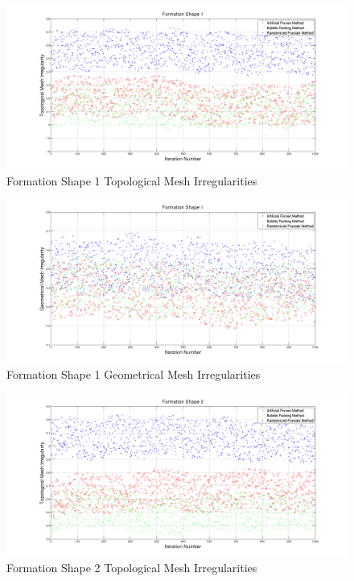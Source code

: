 \begin{figure}[H]
\caption{Formation Shape 1 Topological Mesh Irregularities} \label{topologic_ref_1}
\centerline{\includegraphics[scale = 0.32]{Topological_Irr_1}}
\end{figure} 	
		
\begin{figure}[H]
\caption{Formation Shape 1 Geometrical Mesh Irregularities} \label{geometric_ref_1}
\centerline{\includegraphics[scale = 0.32]{Geometrical_Irr_1}}
\end{figure} 	

\begin{figure}[H]
\caption{Formation Shape 2 Topological Mesh Irregularities} \label{topologic_ref_2}
\centerline{\includegraphics[scale = 0.32]{Topological_Irr_2}}
\end{figure} 	
				
